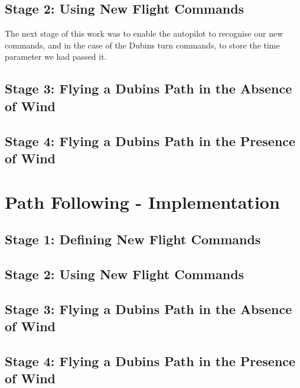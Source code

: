 \subsection{Stage 2: Using New Flight Commands}
\label{task2:design:stage2}

The next stage of this work was to enable the autopilot to recognise our new commands, and in the case of the Dubins turn commands, to store the time parameter we had passed it. 

\subsection{Stage 3: Flying a Dubins Path in the Absence of Wind}
\label{task2:design:stage3}

\subsection{Stage 4: Flying a Dubins Path in the Presence of Wind}
\label{task2:design:stage4}

\section{Path Following - Implementation}
\label{task2:implementation}

\subsection{Stage 1: Defining New Flight Commands}
\label{task2:implementation:stage1}

\subsection{Stage 2: Using New Flight Commands}
\label{task2:implementation:stage2}

\subsection{Stage 3: Flying a Dubins Path in the Absence of Wind}
\label{task2:implementation:stage3}

\subsection{Stage 4: Flying a Dubins Path in the Presence of Wind}
\label{task2:implementation:stage4}


